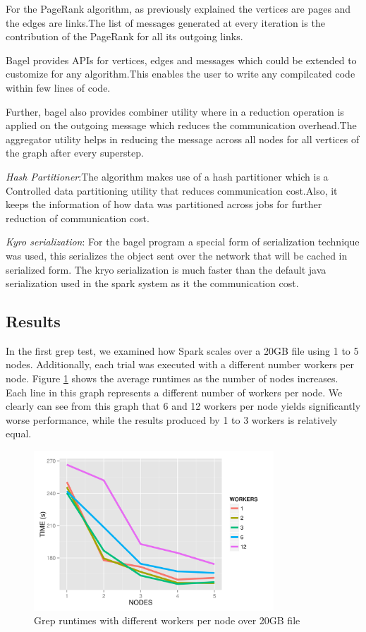 \documentclass{article}
\begin{document}
For the PageRank algorithm, as previously explained the vertices are pages and the edges are links.The list of messages generated at every iteration is the contribution of the PageRank for all its outgoing links.

Bagel provides APIs for vertices, edges and messages which could be extended to customize for any algorithm.This enables the user to write any compilcated code within few lines of code.

Further, bagel also provides combiner utility where in a reduction operation is applied on the outgoing message which reduces the communication overhead.The aggregator utility helps in reducing the message across all nodes for all vertices of the graph after every superstep.

\emph{Hash Partitioner}:The algorithm makes use of a hash partitioner which is a Controlled data partitioning utility that reduces communication cost.Also, it keeps the information of how data was partitioned across jobs for further reduction of communication cost.

\emph{Kyro serialization}: For the bagel program a special form of serialization technique was used, this  serializes the object sent over the network that will be cached in serialized form. The kryo serialization is much faster than the default java serialization used in the spark system as it the communication cost.

\subsection{Results}
In the first grep test, we examined how Spark scales over a 20GB file using 1
to 5 nodes. Additionally, each trial was executed with a different number
workers per node. Figure \ref{fig:workNodeTime} shows the average runtimes as
the number of nodes increases. Each line in this graph represents a different
number of workers per node. We clearly can see from this graph that 6 and 12
workers per node yields significantly worse performance, while the results
produced by 1 to 3 workers is relatively equal.

    \begin{figure}[H]
        \centering
        \includegraphics[width=90mm]{images/workerPerNodeTimes.png}
        \caption{Grep runtimes with different workers per node over 20GB file}
        \label{fig:workNodeTime}
    \end{figure}
\end{document}
